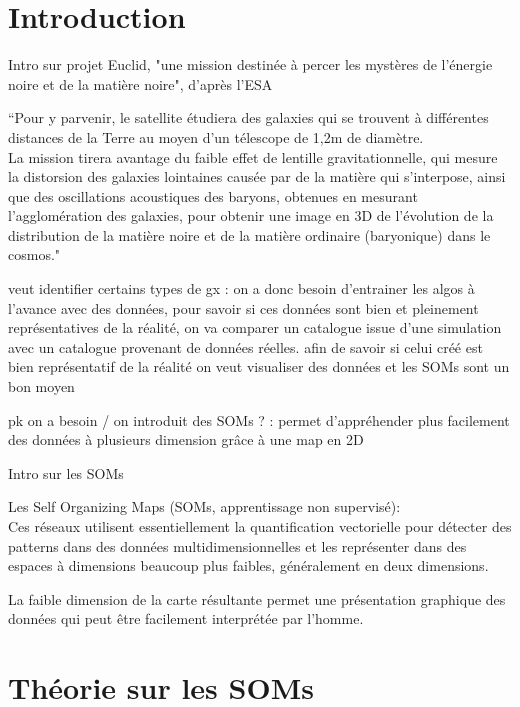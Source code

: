 \documentclass[12pt]{article}
\numberwithin{equation}{section} %
\begin{document}
\part*{Introduction}

Intro sur projet Euclid, "une mission destinée à percer les mystères de l’énergie noire et de la matière noire", d'après l'ESA

“Pour y parvenir, le satellite étudiera des galaxies qui se trouvent à différentes distances de la Terre au moyen d’un télescope de 1,2m de diamètre.\\ 
La mission tirera avantage du faible effet de lentille gravitationnelle, qui mesure la distorsion des galaxies lointaines causée par de la matière qui s’interpose, ainsi que des oscillations acoustiques des baryons, obtenues en mesurant l’agglomération des galaxies, pour obtenir une image en 3D de l’évolution de la distribution de la matière noire et de la matière ordinaire (baryonique) dans le cosmos."


veut identifier certains types de gx : on a donc besoin d'entrainer les algos à l'avance avec des données, pour savoir si ces données sont bien et pleinement représentatives de la réalité, on va comparer un catalogue issue d'une simulation avec un catalogue provenant de données réelles. afin de savoir si celui créé est bien représentatif de la réalité on veut visualiser des données et les SOMs sont un bon moyen

pk on a besoin / on introduit des SOMs ? : permet d'appréhender plus facilement des données à plusieurs dimension grâce à une map en 2D 


\vspace{2cm}
Intro sur les SOMs

Les Self Organizing Maps (SOMs, apprentissage non supervisé):
\\Ces réseaux utilisent essentiellement la quantification vectorielle pour détecter des patterns dans des données multidimensionnelles et les représenter dans des espaces à dimensions beaucoup plus faibles, généralement en deux dimensions.

La faible dimension de la carte résultante permet une présentation graphique des données qui peut être facilement interprétée par l'homme.





\newpage
\part{Théorie sur les SOMs}
\end{document}
